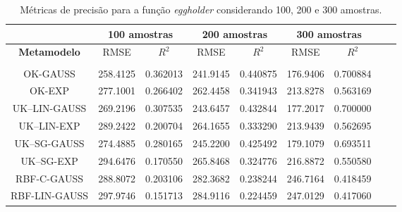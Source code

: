 \begin{table}[H]
	\centering
	\caption{Métricas de precisão para a função \textit{eggholder} considerando 100, 200 e 300 amostras.} \label{tab:7} 
	\begin{tabular}{c c c c c c c c c}
		\toprule
		& \multicolumn{2}{c}{\bf 100 amostras} & \multicolumn{2}{c}{\bf 200 amostras} & \multicolumn{2}{c}{\bf 300 amostras} \\ \midrule
		{\bf Metamodelo} & RMSE & {\bf $R^{2}$} & RMSE & {\bf $R^{2}$} & RMSE & {\bf $R^{2}$} \\
		\hline \\[2pt] 
		{OK-GAUSS} & 258.4125 & 0.362013 & 241.9145 & 0.440875 & 176.9406 &	0.700884 \\[4pt]
		OK-EXP & 277.1001 &	0.266402 & 262.4458 & 0.341943 & 213.8278 &	0.563169   \\[4pt]                 
		UK–LIN-GAUSS & 269.2196 & 0.307535 & 243.6457 & 0.432844 & 177.2017 & 0.700000   \\[4pt]
		UK–LIN-EXP & 289.2422 &	0.200704 & 264.1655 & 0.333290 & 213.9439 &	0.562695    \\[4pt]
		UK–SG-GAUSS & 274.4885 & 0.280165 & 245.2200 & 0.425492  & 179.1079 &	0.693511   \\[4pt]
		UK–SG-EXP & 294.6476 & 0.170550 & 265.8468 & 0.324776 & 216.8872 &	0.550580   \\[4pt]
		RBF-C-GAUSS & 288.8072 & 0.203106 & 282.3682 &	0.238244 & 246.7164 &	0.418459  \\[4pt]
		RBF-LIN-GAUSS & 297.9746 & 0.151713 & 284.9116 & 0.224459 & 247.0129 & 0.417060  \\[4pt] \bottomrule
		
	\end{tabular}
	
\end{table}


